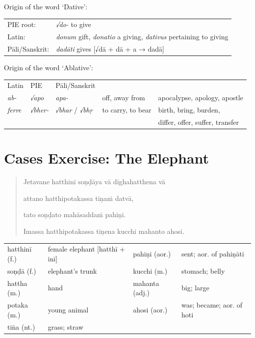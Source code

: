 \documentclass[11pt,oneside]{memoir}
\begin{document}
Origin of the word `Dative':

\begin{center}
\begin{tabular}{ll}
PIE root: & \emph{√do-} to give\\[0pt]
Latin: & \emph{donum} gift, \emph{donatio} a giving, \emph{dativus} pertaining to giving\\[0pt]
Pāli/Sanskrit: & \emph{dadāti} gives [√dā + dā + a → dadā]\\[0pt]
\end{tabular}
\end{center}

Origin of the word `Ablative':

\begin{center}
\begin{tabular}{lllll}
Latin & PIE & Pāli/Sanskrit &  & \\[0pt]
\emph{ab-} & \emph{√apo} & \emph{apa-} & off, away from & apocalypse, apology, apostle\\[0pt]
\emph{ferre} & \emph{√bher-} & \emph{√bhar} / \emph{√bhṛ} & to carry, to bear & birth, bring, burden,\\[0pt]
 &  &  &  & differ, offer, suffer, transfer\\[0pt]
\end{tabular}
\end{center}

\clearpage

\section{Cases Exercise: The Elephant}
\label{sec:orge4ef9e7}

\casesLegendHeaderBGHere

\begin{quote}
Jetavane hatthinī soṇḍāya vā dīghahatthena vā

attano hatthipotakassa tiṇaṁ datvā,

tato soṇḍato mahāsaddaṁ pahiṇi.

Imassa hatthipotakassa tiṇena kucchi mahanto ahosi.
\end{quote}

\bigskip

\begin{center}
\begin{tabular}{llll}
hatthinī (f.) & female elephant [hatthī + inī] & pahiṇi (aor.) & sent; aor. of pahiṇāti\\[0pt]
soṇḍā (f.) & elephant's trunk & kucchi (m.) & stomach; belly\\[0pt]
hattha (m.) & hand & mahanta (adj.) & big; large\\[0pt]
potaka (m.) & young animal & ahosi (aor.) & was; became; aor. of hoti\\[0pt]
tiṅa (nt.) & grass; straw &  & \\[0pt]
\end{tabular}
\end{center}
\end{document}
